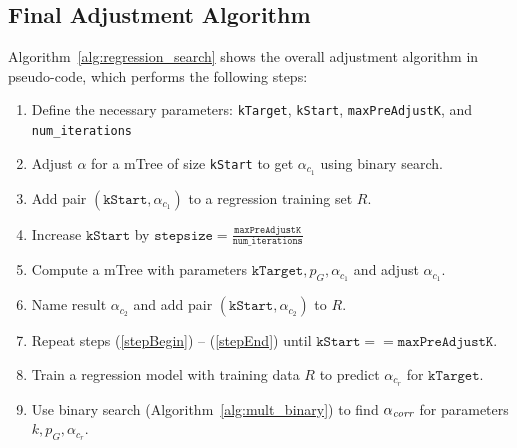 \subsection{Final Adjustment Algorithm}
Algorithm~\ref{alg:regression_search} shows the overall adjustment algorithm in pseudo-code, which performs the following steps:
%
\begin{enumerate}
	\item Define the necessary parameters: \texttt{kTarget}, \texttt{kStart}, \texttt{maxPreAdjustK}, and \texttt{num\_iterations}
	\item Adjust $\alpha$ for a mTree of size \texttt{kStart} to get $\alpha_{c_1}$ using binary search.
	\item Add pair $\left(\texttt{kStart}, \alpha_{c_1}\right)$ to a regression training set $R$.
	\item \label{stepBegin} Increase $\texttt{kStart}$ by $\texttt{stepsize}=\frac{\texttt{maxPreAdjustK}}{\texttt{num\_iterations}}$
	\item Compute a mTree with parameters $\texttt{kTarget}, p_G, \alpha_{c_1}$ and adjust $\alpha_{c_1}$.
	\item \label{stepEnd} Name result $\alpha_{c_2}$ and add pair $\left(\texttt{kStart}, \alpha_{c_2}\right)$ to $R$.
	\item Repeat steps (\ref{stepBegin}) -- (\ref{stepEnd}) until $\texttt{kStart} == \texttt{maxPreAdjustK}$.
	\item Train a regression model with training data $R$ to predict $\alpha_{c_r}$ for $\texttt{kTarget}$.
	\item Use binary search (Algorithm~\ref{alg:mult_binary}) to find $\alpha_\textit{corr}$ for parameters $k,p_G, \alpha_{c_r}$.
\end{enumerate}
%
